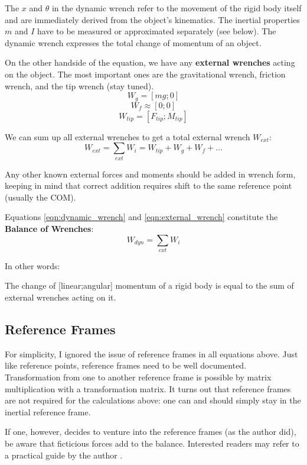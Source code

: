 \documentclass[10pt,a4paper]{article}
\begin{document}
The \(x\) and \(\theta\) in the dynamic wrench refer to the movement of the rigid body itself and are immediately derived from the object's kinematics.
The inertial properties \(m\) and \(I\) have to be measured or approximated separately (see below).
The dynamic wrench expresses the total change of momentum of an object.


On the other handside of the equation, we have any \textbf{external wrenches} acting on the object.
The most important ones are the gravitational wrench, friction wrench, and the tip wrench (stay tuned).
\[W_{g} = \left[ mg; 0 \right]\]
\[W_{f} \approx \left[ 0; 0 \right]\]
\[W_{tip} = \left[ F_{tip}; M_{tip} \right]\]

We can sum up all external wrenches to get a total external wrench \(W_{ext}\):
\begin{equation}\label{eqn:external_wrench}
W_{ext} = \sum\limits_{ext} W_{i} = W_{tip} +W_{g}+W_{f}+\ldots
\end{equation}

Any other known external forces and moments should be added in wrench form, keeping in mind that correct addition requires shift to the same reference point (usually the COM).


Equations \eqref{eqn:dynamic_wrench} and \eqref{eqn:external_wrench} constitute the \textbf{Balance of Wrenches}:
\begin{equation}\label{eqn:balance_of_wrenches}
W_{dyn} = \sum\limits_{ext} W_{i}
\end{equation}

In other words:
\begin{center}
The change of [linear;angular] momentum of a rigid body is equal to the sum of external wrenches acting on it.
\end{center}


\subsection{Reference Frames}
\label{sec:org3e10abc}

For simplicity, I ignored the issue of reference frames in all equations above.
Just like reference points, reference frames need to be well documented.
Transformation from one to another reference frame is possible by matrix multiplication with a transformation matrix.
It turns out that reference frames are not required for the calculations above: one can and should simply stay in the inertial reference frame.

If one, however, decides to venture into the reference frames (as the author did), be aware that ficticious forces add to the balance.
Interested readers may refer to a practical guide by the author \citep{Mielke2020wrenches}.
\end{document}
